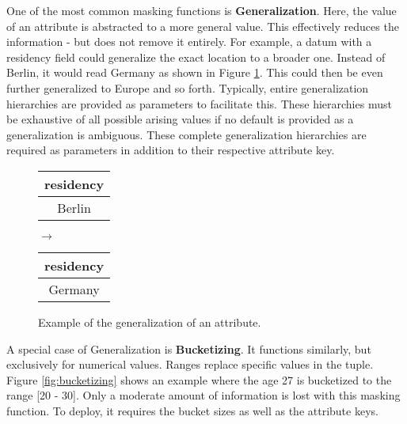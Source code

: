 One of the most common masking functions is \textbf{Generalization}. Here, the value of an attribute is abstracted to a more general value. This effectively reduces the information - but does not remove it entirely. For example, a datum with a residency field could generalize the exact location to a broader one. Instead of Berlin, it would read Germany as shown in Figure \ref{fig:generalization}. This could then be even further generalized to Europe and so forth. Typically, entire generalization hierarchies are provided as parameters to facilitate this. These hierarchies must be exhaustive of all possible arising values if no default is provided as a generalization is ambiguous. These complete generalization hierarchies are required as parameters in addition to their respective attribute key. 

\bigskip

\begin{figure}[ht]
    \begin{center}
    \footnotesize{
        \renewcommand{\arraystretch}{1.5}
        \begin{tabular}{|c|}
            \hline
            residency \\
            \hline
            Berlin \\
            \hline
            \end{tabular}
            \quad $\longrightarrow$ \quad
            \begin{tabular}{|c|}
            \hline
            residency \\
            \hline
            Germany \\
            \hline
        \end{tabular}
    }
    \end{center}
    \caption{Example of the generalization of an attribute.\label{fig:generalization}}
\end{figure}

A special case of Generalization is \textbf{Bucketizing}. It functions similarly, but exclusively for numerical values. Ranges replace specific values in the tuple. Figure \ref{fig:bucketizing} shows an example where the age 27 is bucketized to the range {[20 - 30]}. Only a moderate amount of information is lost with this masking function. To deploy, it requires the bucket sizes as well as the attribute keys. 

\bigskip

